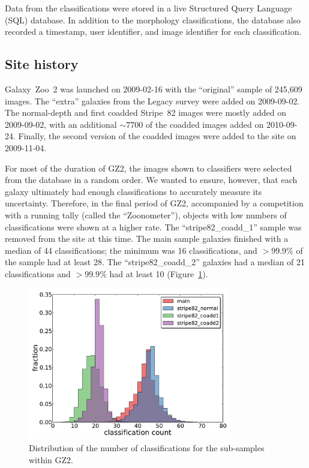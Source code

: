 \documentclass[useAMS,usenatbib]{mn2e}
\begin{document}
Data from the classifications were stored in a live Structured Query Language (SQL) database. In addition to the morphology classifications, the database also recorded a timestamp, user identifier, and image identifier for each classification. 

\subsection{Site history}\label{ssec-site_history}

Galaxy~Zoo~2 was launched on 2009-02-16 with the ``original'' sample of 245,609 images. The ``extra'' galaxies from the Legacy survey were added on 2009-09-02. The normal-depth and first coadded Stripe~82 images were mostly added on 2009-09-02, with an additional $\sim7700$ of the coadded images added on 2010-09-24. Finally, the second version of the coadded images were added to the site on 2009-11-04. 

For most of the duration of GZ2, the images shown to classifiers were selected from the database in a random order. We wanted to ensure, however, that each galaxy ultimately had enough classifications to accurately measure its uncertainty. Therefore, in the final period of GZ2, accompanied by a competition with a running tally (called the ``Zoonometer''), objects with low numbers of classifications were shown at a higher rate. The ``stripe82\_coadd\_1'' sample was removed from the site at this time. The main sample galaxies finished with a median of 44 classifications; the minimum was 16 classifications, and $>99.9\%$ of the sample had at least 28. The ``stripe82\_coadd\_2'' galaxies had a median of 21 classifications and $>99.9\%$ had at least 10 (Figure~\ref{fig-classification_histogram}).

\begin{figure}
\includegraphics[angle=0,width=3.5in]{figures/classification_histogram.pdf}
\caption{Distribution of the number of classifications for the sub-samples within GZ2.
\label{fig-classification_histogram}}
\end{figure}
\end{document}
